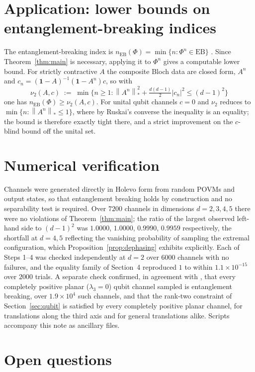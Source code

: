 \documentclass[11pt,a4paper]{article}
\theoremstyle{remark}
\newcommand{\I}{\mathbf{1}}
\newcommand{\nuc}[1]{\left\lVert #1 \right\rVert_{*}}
\begin{document}
\section{Application: lower bounds on entanglement-breaking indices}

The entanglement-breaking index is $n_{\mathrm{EB}}(\Phi)=\min\{n:\Phi^n\in\mathrm{EB}\}$ \cite{LamiGiovannetti,RJP2018,CMW2019,Park2026}. Since Theorem~\ref{thm:main} is necessary, applying it to $\Phi^n$ gives a computable lower bound. For strictly contractive $A$ the composite Bloch data are closed form, $A^n$ and $c_n=(\I-A)^{-1}(\I-A^n)c$, so with
\[
\nu_2(A,c) \;:=\; \min\Big\{n\ge1 : \nuc{A^n}^2+\tfrac{d(d-1)}{2}|c_n|^2 \le (d-1)^2\Big\}
\]
one has $n_{\mathrm{EB}}(\Phi)\ge\nu_2(A,c)$. For unital qubit channels $c=0$ and $\nu_2$ reduces to $\min\{n:\nuc{A^n}\le1\}$, where by Ruskai's converse the inequality is an equality; the bound is therefore exactly tight there, and a strict improvement on the $c$-blind bound off the unital set.

\section{Numerical verification}\label{sec:num}

Channels were generated directly in Holevo form from random POVMs and output states, so that entanglement breaking holds by construction and no separability test is required. Over $7200$ channels in dimensions $d=2,3,4,5$ there were no violations of Theorem~\ref{thm:main}; the ratio of the largest observed left-hand side to $(d-1)^2$ was $1.0000$, $1.0000$, $0.9990$, $0.9959$ respectively, the shortfall at $d=4,5$ reflecting the vanishing probability of sampling the extremal configuration, which Proposition~\ref{prop:dephasing} exhibits explicitly. Each of Steps 1--4 was checked independently at $d=2$ over $6000$ channels with no failures, and the equality family of Section~4 reproduced $1$ to within $1.1\times10^{-15}$ over $2000$ trials. A separate check confirmed, in agreement with \cite[Sec.~5]{Ruskai2003}, that every completely positive planar ($\lambda_3=0$) qubit channel sampled is entanglement breaking, over $1.9\times10^4$ such channels, and that the rank-two constraint of Section~\ref{sec:qubit} is satisfied by every completely positive planar channel, for translations along the third axis and for general translations alike. Scripts accompany this note as ancillary files.

\section{Open questions}
\end{document}
